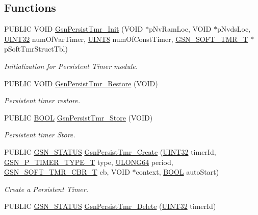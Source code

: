 \subsection*{Functions}
\begin{DoxyCompactItemize}
\item 
PUBLIC VOID \hyperlink{a00671_ga5e91b9000f2f5e74d9d70ee0591035ae}{GsnPersistTmr\_\-Init} (VOID $\ast$pNvRamLoc, VOID $\ast$pNvdsLoc, \hyperlink{a00660_gae1e6edbbc26d6fbc71a90190d0266018}{UINT32} numOfVarTimer, \hyperlink{a00660_gab27e9918b538ce9d8ca692479b375b6a}{UINT8} numOfConstTimer, \hyperlink{a00229}{GSN\_\-SOFT\_\-TMR\_\-T} $\ast$pSoftTmrStructTbl)
\begin{DoxyCompactList}\small\item\em Initialization for Persistent Timer module. \end{DoxyCompactList}\item 
PUBLIC VOID \hyperlink{a00671_ga21c2beb3a3544b189800c56051ca9b6f}{GsnPersistTmr\_\-Restore} (VOID)
\begin{DoxyCompactList}\small\item\em Persistent timer restore. \end{DoxyCompactList}\item 
PUBLIC \hyperlink{a00660_ga1f04022c0a182c51c059438790ea138c}{BOOL} \hyperlink{a00671_ga9af57957c6755f2cc4c6c3d140c623a2}{GsnPersistTmr\_\-Store} (VOID)
\begin{DoxyCompactList}\small\item\em Persistent timer Store. \end{DoxyCompactList}\item 
PUBLIC \hyperlink{a00660_gada5951904ac6110b1fa95e51a9ddc217}{GSN\_\-STATUS} \hyperlink{a00671_ga17f353c07fe849751becba1144e0f8f8}{GsnPersistTmr\_\-Create} (\hyperlink{a00660_gae1e6edbbc26d6fbc71a90190d0266018}{UINT32} timerId, \hyperlink{a00671_gadc3540874fb3842b2eb56edd0c82945b}{GSN\_\-P\_\-TIMER\_\-TYPE\_\-T} type, \hyperlink{a00660_ga28961430434ccabca6862ea93fe9a15b}{ULONG64} period, \hyperlink{a00673_ga9bb74ab1272c117587bf1fadf84849de}{GSN\_\-SOFT\_\-TMR\_\-CBR\_\-T} cb, VOID $\ast$context, \hyperlink{a00660_ga1f04022c0a182c51c059438790ea138c}{BOOL} autoStart)
\begin{DoxyCompactList}\small\item\em Create a Persistent Timer. \end{DoxyCompactList}\item 
PUBLIC \hyperlink{a00660_gada5951904ac6110b1fa95e51a9ddc217}{GSN\_\-STATUS} \hyperlink{a00671_gaacdba3e378b84c6d8d5373afebb43f6b}{GsnPersistTmr\_\-Delete} (\hyperlink{a00660_gae1e6edbbc26d6fbc71a90190d0266018}{UINT32} timerId)

\end{DoxyCompactItemize}
